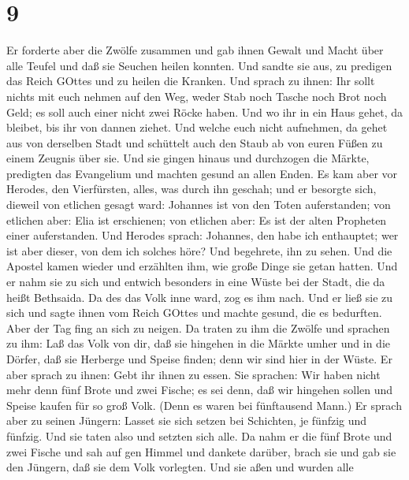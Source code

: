\hypertarget{section-8}{%
\section{9}\label{section-8}}

 Er forderte aber die Zwölfe zusammen und gab ihnen Gewalt
und Macht über alle Teufel und daß sie Seuchen heilen konnten.
 Und sandte sie aus, zu predigen das Reich GOttes und zu
heilen die Kranken.  Und sprach zu ihnen: Ihr sollt nichts
mit euch nehmen auf den Weg, weder Stab noch Tasche noch Brot noch Geld;
es soll auch einer nicht zwei Röcke haben.  Und wo ihr in
ein Haus gehet, da bleibet, bis ihr von dannen ziehet.  Und
welche euch nicht aufnehmen, da gehet aus von derselben Stadt und
schüttelt auch den Staub ab von euren Füßen zu einem Zeugnis über sie.
 Und sie gingen hinaus und durchzogen die Märkte, predigten
das Evangelium und machten gesund an allen Enden.  Es kam
aber vor Herodes, den Vierfürsten, alles, was durch ihn geschah; und er
besorgte sich, dieweil von etlichen gesagt ward: Johannes ist von den
Toten auferstanden;  von etlichen aber: Elia ist erschienen;
von etlichen aber: Es ist der alten Propheten einer auferstanden.
 Und Herodes sprach: Johannes, den habe ich enthauptet; wer
ist aber dieser, von dem ich solches höre? Und begehrete, ihn zu sehen.
 Und die Apostel kamen wieder und erzählten ihm, wie große
Dinge sie getan hatten. Und er nahm sie zu sich und entwich besonders in
eine Wüste bei der Stadt, die da heißt Bethsaida.  Da des
das Volk inne ward, zog es ihm nach. Und er ließ sie zu sich und sagte
ihnen vom Reich GOttes und machte gesund, die es bedurften. Aber der Tag
fing an sich zu neigen.  Da traten zu ihm die Zwölfe und
sprachen zu ihm: Laß das Volk von dir, daß sie hingehen in die Märkte
umher und in die Dörfer, daß sie Herberge und Speise finden; denn wir
sind hier in der Wüste.  Er aber sprach zu ihnen: Gebt ihr
ihnen zu essen. Sie sprachen: Wir haben nicht mehr denn fünf Brote und
zwei Fische; es sei denn, daß wir hingehen sollen und Speise kaufen für
so groß Volk.  (Denn es waren bei fünftausend Mann.) Er
sprach aber zu seinen Jüngern: Lasset sie sich setzen bei Schichten, je
fünfzig und fünfzig.  Und sie taten also und setzten sich
alle.  Da nahm er die fünf Brote und zwei Fische und sah
auf gen Himmel und dankete darüber, brach sie und gab sie den Jüngern,
daß sie dem Volk vorlegten.  Und sie aßen und wurden alle
